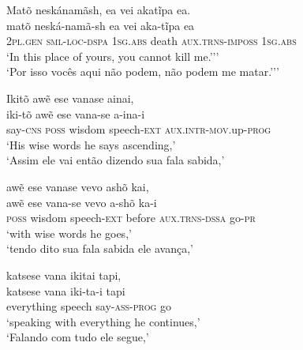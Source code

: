 \documentclass[output=paper,
modfonts,nonflat
]{langsci/langscibook}
\begin{document}
\ea  Matõ neskánamãsh, ea vei akatĩpa ea. \\[.3em]
\gll matõ             neská-namã-sh           ea               vei   aka-tĩpa                 ea               \\
     2\textsc{pl.gen} \textsc{sml-loc-dspa}   1\textsc{sg.abs} death \textsc{aux.trns-imposs} \textsc{1sg.abs} \\
\glt `In this place of yours, you cannot kill me.''{}' \\
`Por isso vocês aqui não podem, não podem me matar.''{}'\\
\z

\ea Ikitõ awẽ ese vanase ainai, \\[.3em]
\gll iki-tõ           awẽ           ese    vana-se             a-ina-i                                \\
     say-\textsc{cns} \textsc{poss} wisdom speech-\textsc{ext} \textsc{aux.intr-mov}.up-\textsc{prog} \\
\glt `His wise words he says ascending,'\footnotemark \\
`Assim ele vai então dizendo sua fala sabida,'\\
\z


\ea awẽ ese vanase vevo ashõ kai, \\[.3em]
\gll awẽ           ese    vana-se             vevo   a-shõ                  ka-i           \\
     \textsc{poss} wisdom speech-\textsc{ext} before \textsc{aux.trns-dssa} go-\textsc{pr} \\
\glt `with wise words he goes,' \\
`tendo dito sua fala sabida ele avança,' \\
\z

\ea katsese vana ikitai tapi, \\[.3em]
\gll katsese    vana   iki-ta-i              tapi \\
     everything speech say-\textsc{ass-prog} go   \\
\glt `speaking with everything he continues,'\footnotemark \\
`Falando com tudo ele segue,'\\
\z

\end{document}
